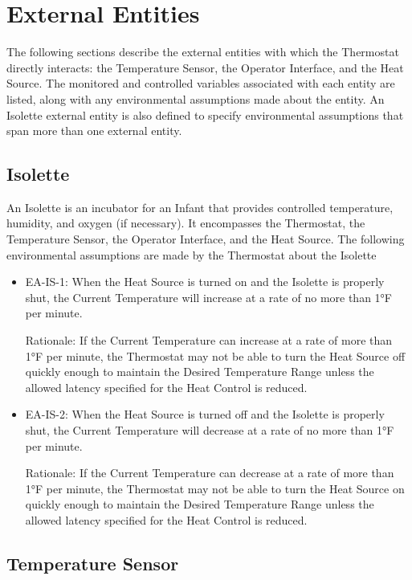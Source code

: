 \chapter{External Entities}
\label{chap:external-entities}

The following sections describe the external entities with which the Thermostat directly
interacts: the Temperature Sensor, the Operator Interface, and the Heat Source. The monitored
and controlled variables associated with each entity are listed, along with any environmental
assumptions made about the entity. An Isolette external entity is also defined to specify
environmental assumptions that span more than one external entity.

\section{Isolette}
\label{sec:isolette}

An Isolette is an incubator for an Infant that provides controlled temperature, humidity, and
oxygen (if necessary). It encompasses the Thermostat, the Temperature Sensor, the Operator
Interface, and the Heat Source. The following environmental assumptions are made by the
Thermostat about the Isolette

\begin{itemize}
\item EA-IS-1: When the Heat Source is turned on and the Isolette is properly shut, the
      Current Temperature will increase at a rate of no more than 1°F per minute.

      Rationale: If the Current Temperature can increase at a rate of more than 1°F per minute,
      the Thermostat may not be able to turn the Heat Source off quickly enough to maintain
      the Desired Temperature Range unless the allowed latency specified for the Heat Control
      is reduced.
\item EA-IS-2: When the Heat Source is turned off and the Isolette is properly shut, the
      Current Temperature will decrease at a rate of no more than 1°F per minute.

      Rationale: If the Current Temperature can decrease at a rate of more than 1°F per
      minute, the Thermostat may not be able to turn the Heat Source on quickly enough to
      maintain the Desired Temperature Range unless the allowed latency specified for the
      Heat Control is reduced.
\end{itemize}

\section{Temperature Sensor}
\label{sec:temperature-sensor}

